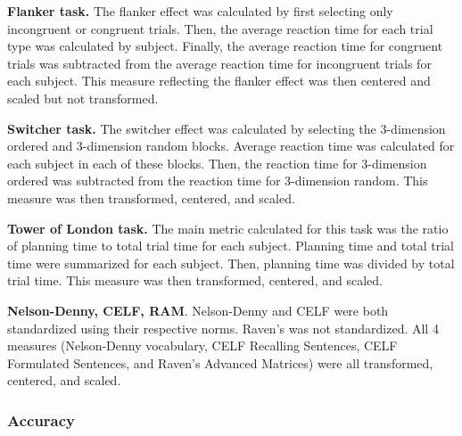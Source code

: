 \documentclass[../dissertation.tex]{subfiles}
\begin{document}
	\textbf{Flanker task.} The flanker effect was calculated by first selecting only incongruent or congruent trials. Then, the average reaction time for each trial type was calculated by subject. Finally, the average reaction time for congruent trials was subtracted from the average reaction time for incongruent trials for each subject. This measure reflecting the flanker effect was then centered and scaled but not transformed. \par
	\textbf{Switcher task.} The switcher effect was calculated by selecting the 3-dimension ordered and 3-dimension random blocks. Average reaction time was calculated for each subject in each of these blocks. Then, the reaction time for 3-dimension ordered was subtracted from the reaction time for 3-dimension random. This measure was then transformed, centered, and scaled. \par 
	\textbf{Tower of London task.} The main metric calculated for this task was the ratio of planning time to total trial time for each subject. Planning time and total trial time were summarized for each subject. Then, planning time was divided by total trial time. This measure was then transformed, centered, and scaled. \par 
	\textbf{Nelson-Denny, CELF, RAM}. Nelson-Denny and CELF were both standardized using their respective norms. Raven's was not standardized. All 4 measures (Nelson-Denny vocabulary, CELF Recalling Sentences, CELF Formulated Sentences, and Raven's Advanced Matrices) were all transformed, centered, and scaled.
	
\subsubsection{Accuracy}
\end{document}
